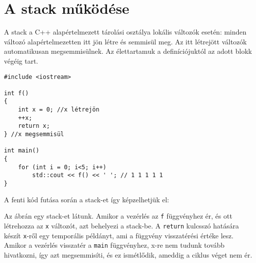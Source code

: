 \documentclass[a4paper,11.5pt,table]{article}
\begin{document}
	\section{A stack működése}
	A stack a C++ alapértelmezett tárolási osztálya lokális változók esetén: minden változó alapértelmezetten itt jön létre és semmisül meg. Az itt létrejött változók automatikusan megsemmisülnek. Az élettartamuk a definíciójuktól az adott blokk végéig tart.
	
	\begin{lstlisting}
#include <iostream>

int f()
{
	int x = 0; //x létrejön
	++x;
	return x;
} //x megsemmisül

int main()
{
	for (int i = 0; i<5; i++)
		std::cout << f() << ' '; // 1 1 1 1 1
}
	\end{lstlisting}
	\medskip
	
	A fenti kód futása során a stack-et így képzelhetjük el:
	
	\begin{figure}[!h]
		\centering
	\end{figure}
	Az ábrán egy stack-et látunk. Amikor a vezérlés az \texttt{f} függvényhez ér, és ott létrehozza az \texttt{x} változót, azt behelyezi a stack-be. A \texttt{return} kulcsszó hatására készít \texttt{x}-ről egy temporális példányt, ami a függvény visszatérési értéke lesz. Amikor a vezérlés visszatér a \texttt{main} függvényhez, {x}-re nem tudunk tovább hivatkozni, így azt megsemmisíti, és ez ismétlődik, ameddig a ciklus véget nem ér.
	\smallskip
	
\end{document}
